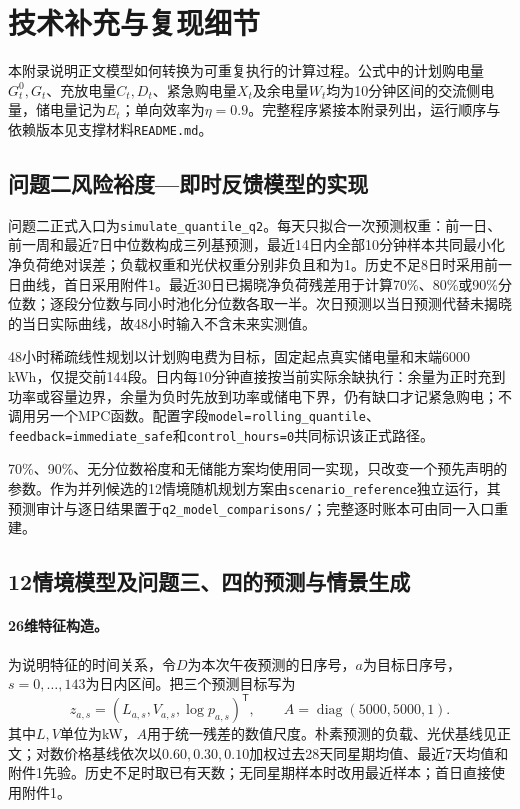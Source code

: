 \section{技术补充与复现细节}
\label{app:technical}
\label{app:implementation}

本附录说明正文模型如何转换为可重复执行的计算过程。公式中的计划购电量$G_t^0,G_t$、充放电量$C_t,D_t$、紧急购电量$X_t$及余电量$W_t$均为10分钟区间的交流侧电量，储电量记为$E_t$；单向效率为$\eta=0.9$。完整程序紧接本附录列出，运行顺序与依赖版本见支撑材料\texttt{README.md}。

\subsection{问题二风险裕度—即时反馈模型的实现}
问题二正式入口为\texttt{simulate\_quantile\_q2}。每天只拟合一次预测权重：前一日、前一周和最近7日中位数构成三列基预测，最近14日内全部10分钟样本共同最小化净负荷绝对误差；负载权重和光伏权重分别非负且和为1。历史不足8日时采用前一日曲线，首日采用附件1。最近30日已揭晓净负荷残差用于计算70\%、80\%或90\%分位数；逐段分位数与同小时池化分位数各取一半。次日预测以当日预测代替未揭晓的当日实际曲线，故48小时输入不含未来实测值。

48小时稀疏线性规划以计划购电费为目标，固定起点真实储电量和末端6000 kWh，仅提交前144段。日内每10分钟直接按当前实际余缺执行：余量为正时充到功率或容量边界，余量为负时先放到功率或储电下界，仍有缺口才记紧急购电；不调用另一个MPC函数。配置字段\texttt{model=rolling\_quantile}、\texttt{feedback=immediate\_safe}和\texttt{control\_hours=0}共同标识该正式路径。

70\%、90\%、无分位数裕度和无储能方案均使用同一实现，只改变一个预先声明的参数。作为并列候选的12情境随机规划方案由\texttt{scenario\_reference}独立运行，其预测审计与逐日结果置于\texttt{q2\_model\_comparisons/}；完整逐时账本可由同一入口重建。

\subsection{12情境模型及问题三、四的预测与情景生成}
\label{app:forecast}

\paragraph{26维特征构造。}
为说明特征的时间关系，令$D$为本次午夜预测的日序号，$a$为目标日序号，$s=0,\ldots,143$为日内区间。把三个预测目标写为
\begin{equation}
 z_{a,s}=(L_{a,s},V_{a,s},\log p_{a,s})^{\mathsf T},\qquad
 A=\operatorname{diag}(5000,5000,1).
\end{equation}
其中$L,V$单位为kW，$A$用于统一残差的数值尺度。朴素预测的负载、光伏基线见正文；对数价格基线依次以$0.60,0.30,0.10$加权过去28天同星期均值、最近7天均值和附件1先验。历史不足时取已有天数；无同星期样本时改用最近样本；首日直接使用附件1。


